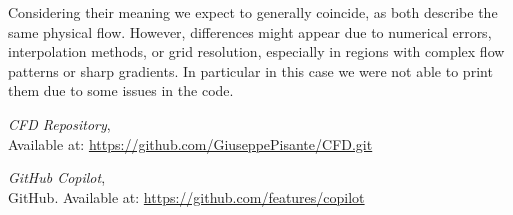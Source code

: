 \documentclass{article}
\begin{document}
Considering their meaning we expect to generally coincide, as both describe the same physical flow. However, differences might appear due to numerical errors, interpolation methods, or grid resolution, especially in regions with complex flow patterns or sharp gradients.
In particular in this case we were not able to print them due to some issues in the code.


\begin{thebibliography}{9}
    \textit{CFD Repository},\\
    Available at: \url{https://github.com/GiuseppePisante/CFD.git}
    
    \textit{GitHub Copilot},\\
    GitHub. Available at: \url{https://github.com/features/copilot}
    \end{thebibliography}
\end{document}
